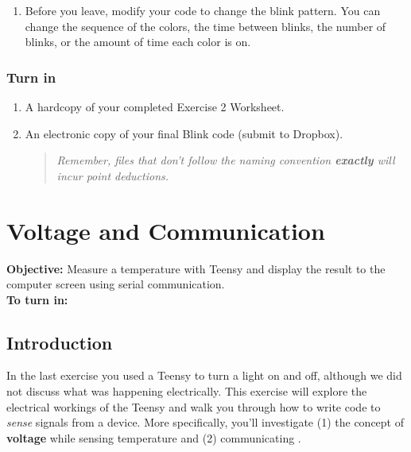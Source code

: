 \documentclass[]{book}
\providecommand{\tightlist}{%
  \setlength{\itemsep}{0pt}\setlength{\parskip}{0pt}}
\begin{document}
\begin{enumerate}
\def\labelenumi{\arabic{enumi}.}
\tightlist
\item
  Before you leave, modify your code to change the blink pattern. You can change the sequence of the colors, the time between blinks, the number of blinks, or the amount of time each color is on.
\end{enumerate}

\hypertarget{turn-in}{%
\subsection{Turn in}\label{turn-in}}

\begin{enumerate}
\def\labelenumi{\arabic{enumi}.}
\item
  A hardcopy of your completed Exercise 2 Worksheet.
\item
  An electronic copy of your final Blink code (submit to Dropbox).

  \begin{quote}
  \emph{Remember, files that don't follow the naming convention \textbf{exactly} will incur point deductions.}
  \end{quote}
\end{enumerate}

\hypertarget{voltage-and-communication}{%
\chapter{Voltage and Communication}\label{voltage-and-communication}}

\textbf{Objective:} Measure a temperature with Teensy and display the result to the computer screen using serial communication.\\
\textbf{To turn in:}

\hypertarget{introduction-2}{%
\section*{Introduction}\label{introduction-2}}

In the last exercise you used a Teensy to turn a light on and off, although we did not discuss what was happening electrically. This exercise will explore the electrical workings of the Teensy and walk you through how to write code to \emph{sense} signals from a device. More specifically, you'll investigate (1) the concept of \textbf{voltage} while sensing temperature and (2) communicating .
\end{document}
